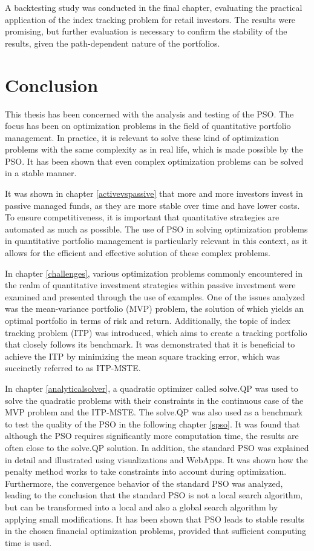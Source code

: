 \documentclass[
  oneside, a4paper, 12pt, openany]{book}
\theoremstyle{definition}
\theoremstyle{definition}
\theoremstyle{definition}
\theoremstyle{definition}
\theoremstyle{remark}
\begin{document}
A backtesting study was conducted in the final chapter, evaluating the practical application of the index tracking problem for retail investors. The results were promising, but further evaluation is necessary to confirm the stability of the results, given the path-dependent nature of the portfolios.

\hypertarget{conclusion}{%
\chapter{Conclusion}\label{conclusion}}

This thesis has been concerned with the analysis and testing of the PSO. The focus has been on optimization problems in the field of quantitative portfolio management. In practice, it is relevant to solve these kind of optimization problems with the same complexity as in real life, which is made possible by the PSO. It has been shown that even complex optimization problems can be solved in a stable manner.

It was shown in chapter \ref{activevspassive} that more and more investors invest in passive managed funds, as they are more stable over time and have lower costs. To ensure competitiveness, it is important that quantitative strategies are automated as much as possible. The use of PSO in solving optimization problems in quantitative portfolio management is particularly relevant in this context, as it allows for the efficient and effective solution of these complex problems.

In chapter \ref{challenges}, various optimization problems commonly encountered in the realm of quantitative investment strategies within passive investment were examined and presented through the use of examples. One of the issues analyzed was the mean-variance portfolio (MVP) problem, the solution of which yields an optimal portfolio in terms of risk and return. Additionally, the topic of index tracking problem (ITP) was introduced, which aims to create a tracking portfolio that closely follows its benchmark. It was demonstrated that it is beneficial to achieve the ITP by minimizing the mean square tracking error, which was succinctly referred to as ITP-MSTE.

In chapter \ref{analyticalsolver}, a quadratic optimizer called solve.QP was used to solve the quadratic problems with their constraints in the continuous case of the MVP problem and the ITP-MSTE. The solve.QP was also used as a benchmark to test the quality of the PSO in the following chapter \ref{spso}. It was found that although the PSO requires significantly more computation time, the results are often close to the solve.QP solution. In addition, the standard PSO was explained in detail and illustrated using visualizations and WebApps. It was shown how the penalty method works to take constraints into account during optimization. Furthermore, the convergence behavior of the standard PSO was analyzed, leading to the conclusion that the standard PSO is not a local search algorithm, but can be transformed into a local and also a global search algorithm by applying small modifications. It has been shown that PSO leads to stable results in the chosen financial optimization problems, provided that sufficient computing time is used.
\end{document}
